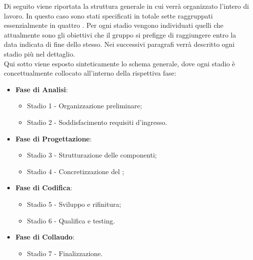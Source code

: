 Di seguito viene riportata la struttura generale in cui verrà organizzato l'intero  di lavoro. In questo caso sono stati specificati in totale sette  raggruppati essenzialmente in quattro . Per ogni stadio vengono individuati quelli che attualmente sono gli obiettivi che il gruppo \Gruppo{} si prefigge di raggiungere entro la data indicata di fine dello stesso. Nei successivi paragrafi verrà descritto ogni stadio più nel dettaglio.\\
Qui sotto viene esposto sinteticamente lo schema generale, dove ogni stadio è concettualmente collocato all'interno della rispettiva fase:

\begin{itemize}
    \item \textbf{Fase di Analisi}:
    \begin{itemize}
        \item Stadio 1 - Organizzazione preliminare;
        \item Stadio 2 - Soddisfacimento requisiti d'ingresso.
    \end{itemize}

    \item \textbf{Fase di Progettazione}:
    \begin{itemize}
        \item Stadio 3 - Strutturazione delle componenti;
        \item Stadio 4 - Concretizzazione del ;
    \end{itemize}

    \item \textbf{Fase di Codifica}:
    \begin{itemize}  
        \item Stadio 5 - Sviluppo e rifinitura;
        \item Stadio 6 - Qualifica e testing.
    \end{itemize}

    \item \textbf{Fase di Collaudo}:
    \begin{itemize}        
        \item Stadio 7 - Finalizzazione.
    \end{itemize}
\end{itemize}

